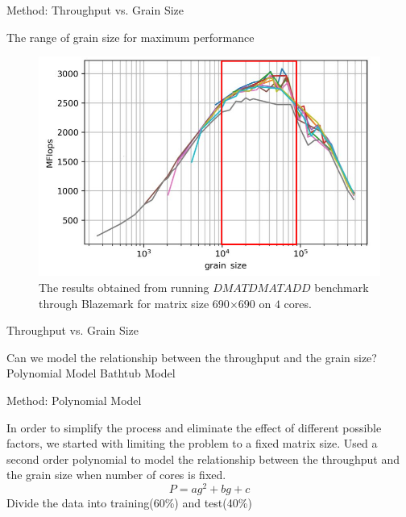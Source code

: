 \documentclass[10pt]{beamer}
\begin{document}
\begin{frame}{Method: Throughput vs. Grain Size}
	\begin{outline}		
		The range of grain size for maximum performance
		\begin{figure}[H]
			\centering\includegraphics[scale=0.9]{images/fig6_range.png}
			\caption{The results obtained from running $DMATDMATADD$ benchmark through Blazemark for matrix size 690$\times$690 on $4$ cores.}	
			\label{fig7}
		\end{figure}
		
	\end{outline}
\end{frame}

\begin{frame}{Throughput vs. Grain Size}
	\begin{outline}
		Can we model the relationship between the throughput and the grain size?
		\pause
		\1Polynomial Model
		\1Bathtub Model
	\end{outline}
\end{frame}


\begin{frame}{Method: Polynomial Model}
	\begin{outline}
		In order to simplify the process and eliminate the effect of different possible factors, we started with limiting the problem to a fixed matrix size.	
		\1Used a second order polynomial to model the relationship between the throughput and the grain size when number of cores is fixed.
		 $$P=ag^2+bg+c$$    
		 \1Divide the data into training(60\%) and test(40\%)
	\end{outline}
\end{frame}
\end{document}

